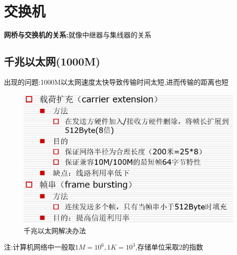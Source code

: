 \documentclass[UTF8,a4paper]{ctexart}
\begin{document}
\section{交换机}
\textbf{网桥与交换机的关系:}就像中继器与集线器的关系

\subsection{千兆以太网(1000M)}
出现的问题:1000M以太网速度太快导致传输时间太短,进而传输的距离也短
\begin{figure}[H]
  \centering
  \includegraphics[scale = 0.5]{assets/jisuanjiwangluo_72a2b.png}
  \caption{千兆以太网解决办法}
\end{figure}

注:计算机网络中一般取$1M = 10^6 , 1K = 10^3$,存储单位采取2的指数
\end{document}
